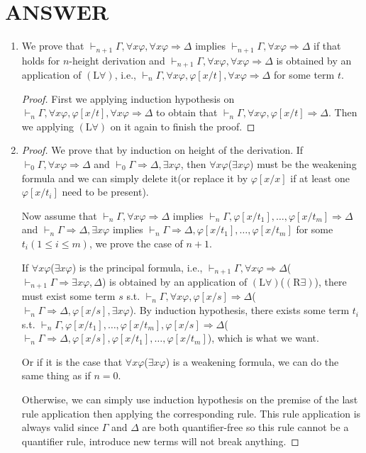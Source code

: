 \documentclass[12pt]{article}
\newcommand\A{\varphi}
\newcommand\GG\Gamma
\newcommand\D\Delta
\newcommand\TO\Rightarrow
\newcommand\LU{\textrm{L$\forall$}}
\newcommand\RX{\textrm{R$\exists$}}
\begin{document}
\section{ANSWER}
\begin{enumerate}
    \item We prove that $\vdash_{n+1}\GG,\forall x\A,\forall x\A\TO\D$ implies $\vdash_{n+1}\GG,\forall x\A\TO\D$ if that holds for $n$-height derivation and $\vdash_{n+1}\GG,\forall x\A,\forall x\A\TO\D$ is obtained by an application of $(\LU)$, i.e., $\vdash_n\GG,\forall x\A,\A[x/t],\forall x\A\TO\D$ for some term $t$. \begin{proof}
        First we applying induction hypothesis on $\vdash_n\GG,\forall x\A,\A[x/t],\forall x\A\TO\D$ to obtain that $\vdash_n\GG,\forall x\A,\A[x/t]\TO\D$. Then we applying $(\LU)$ on it again to finish the proof.
    \end{proof}
    \item \begin{proof}
        We prove that by induction on height of the derivation. If $\vdash_0\GG,\forall x\A\TO\D$ and $\vdash_0\GG\TO\D,\exists x\A$, then $\forall x\A$($\exists x\A$) must be the weakening formula and we can simply delete it(or replace it by $\A[x/x]$ if at least one $\A[x/t_i]$ need to be present).
        
        Now assume that $\vdash_n\GG,\forall x\A\TO\D$ implies $\vdash_n\GG,\A[x/t_1],\ldots,\A[x/t_m]\TO\D$ and $\vdash_n\GG\TO\D,\exists x\A$ implies $\vdash_n\GG\TO\D,\A[x/t_1],\ldots,\A[x/t_m]$ for some $t_i(1\le i\le m)$, we prove the case of $n+1$.
        
        If $\forall x\A$($\exists x\A$) is the principal formula, i.e., $\vdash_{n+1}\GG,\forall x\A\TO\D$($\vdash_{n+1}\GG\TO\exists x\A,\D$) is obtained by an application of $(\LU)$($(\RX)$), there must exist some term $s$ s.t. $\vdash_n\GG,\forall x\A,\A[x/s]\TO\D$($\vdash_n\GG\TO\D,\A[x/s],\exists x\A$). By induction hypothesis, there exists some term $t_i$ s.t. $\vdash_n\GG,\A[x/t_1],\ldots,\A[x/t_m],\A[x/s]\TO\D$($\vdash_n\GG\TO\D,\A[x/s],\A[x/t_1],\ldots,\A[x/t_m]$), which is what we want.
        
        Or if it is the case that $\forall x\A$($\exists x\A$) is a weakening formula, we can do the same thing as if $n=0$.
        
        Otherwise, we can simply use induction hypothesis on the premise of the last rule application then applying the corresponding rule. This rule application is always valid since $\GG$ and $\D$ are both quantifier-free so this rule cannot be a quantifier rule, introduce new terms will not break anything.
    \end{proof}
\end{enumerate}
\end{document}
